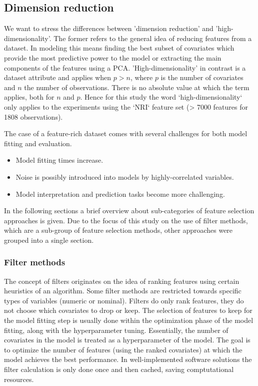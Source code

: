 \documentclass[letterpaper, peerreview]{IEEEtran}
\begin{document}
\subsection{Dimension reduction}

\noindent We want to stress the differences between 'dimension reduction' and 'high-dimensionality'.
The former refers to the general idea of reducing features from a dataset\cite{vandermaaten2007}.
In modeling this means finding the best subset of covariates which provide the most predictive power to the model or extracting the main components of the features using a \ac{PCA}.
'High-dimensionality' in contrast is a dataset attribute and applies when \(p > n\), where \(p\) is the number of covariates and \(n\) the number of observations\cite{hastie2001}.
There is no absolute value at which the term applies, both for \(n\) and \(p\).
Hence for this study the word ‘high-dimensionality‘ only applies to the
experiments using the ‘NRI‘ feature set (> 7000 features for 1808 observations).

The case of a feature-rich dataset comes with several challenges for both model fitting and evaluation.

\begin{itemize}
	\item Model fitting times increase.
	\item Noise is possibly introduced into models by highly-correlated variables\cite{johnstoneiainm.2009}.
	\item Model interpretation and prediction tasks become more challenging\cite{johnstoneiainm.2009}.
\end{itemize}

\noindent In the following sections a brief overview about sub-categories of feature selection approaches is given.
Due to the focus of this study on the use of filter methods, which are a sub-group of feature selection methods, other approaches were grouped into a single section.

\subsubsection{Filter methods}

\noindent The concept of filters originates on the idea of ranking features using certain heuristics of an algorithm\cite{chandrashekar2014}.
Some filter methods are restricted towards specific types of variables (numeric or nominal).
Filters do only rank features, they do not choose which covariates to drop or keep\cite{drotar2015}.
The selection of features to keep for the model fitting step is usually done within the optimization phase of the model fitting, along with the hyperparameter tuning.
Essentially, the number of covariates in the model is treated as a hyperparameter of the model.
The goal is to optimize the number of features (using the ranked covariates) at which the model achieves the best performance.
In well-implemented software solutions the filter calculation is only done once and then cached, saving comptutational resources\cite{mlr}.
\end{document}

